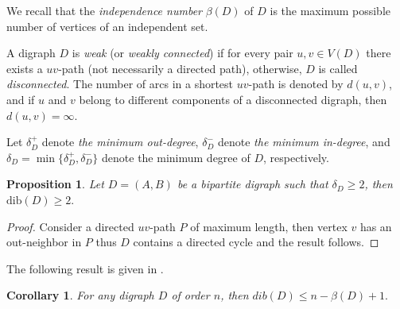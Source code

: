 \documentclass[12pt]{article}
\newtheorem{corollary}[theorem]{Corollary}
\newtheorem{proposition}[theorem]{Proposition}
\begin{document}
We recall that the \textit{independence number} $\beta(D)$ of $D$ is the maximum possible number of vertices of an independent set. 

A digraph $D$ is \emph{weak} (or \emph{weakly connected}) if for every pair $u,v \in V(D)$ there exists a $uv$-path (not necessarily a directed path), otherwise, $D$ is called \emph{disconnected}. The number of arcs in a shortest $uv$-path  is denoted by $d(u,v)$, and if $u$ and $v$ belong to different components of a disconnected digraph, then $d(u,v)= \infty$.
 

Let $\delta^+_D$ denote \emph{the minimum out-degree}, $\delta^-_D$ denote \emph{the minimum in-degree}, and $\delta_D=\min\{\delta^+_D,\delta^-_D\}$ denote the minimum degree of $D$, respectively.


\begin{proposition}\label{prop5}
Let $D=(A , B)$ be a bipartite digraph such that $\delta_D\geq 2$, then $\text{dib}(D)\geq 2.$ 
\end{proposition}
\begin{proof}
Consider a directed $uv$-path $P$ of maximum length, then vertex $v$ has an out-neighbor in $P$ thus $D$ contains a directed cycle and the result follows.
\end{proof}

The following result is given in \cite{javiernol2024dibchromaticnumberdigraphs}.

\begin{corollary}\label{cor5}\cite{javiernol2024dibchromaticnumberdigraphs}
For any digraph $D$ of order $n$, then $dib(D)\leq n-\beta(D)+1.$
\end{corollary}
\end{document}
